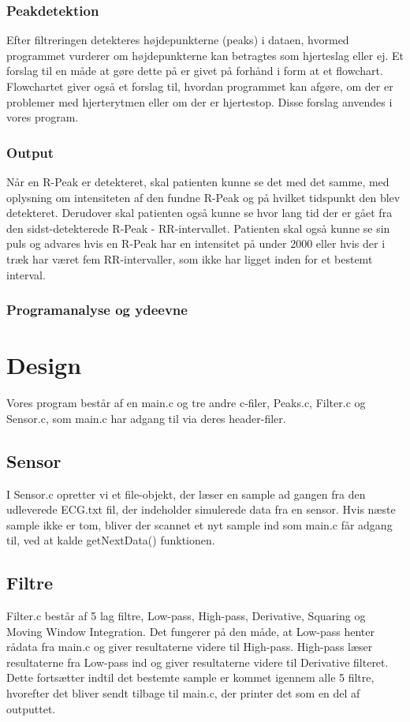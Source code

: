 \documentclass{article}
\begin{document}
\subsubsection{Peakdetektion}
Efter filtreringen detekteres højdepunkterne (peaks) i dataen, hvormed programmet vurderer om højdepunkterne kan betragtes som hjerteslag eller ej. Et forslag til en måde at gøre dette på er givet på forhånd i form at et flowchart. Flowchartet giver også et forslag til, hvordan programmet kan afgøre, om der er problemer med hjerterytmen eller om der er hjertestop. Disse forslag anvendes i vores program.

\subsubsection{Output}
Når en R-Peak er detekteret, skal patienten kunne se det med det samme, med oplysning om intensiteten af den fundne R-Peak og på hvilket tidspunkt den blev detekteret. Derudover skal patienten også kunne se hvor lang tid der er gået fra den sidst-detekterede R-Peak - RR-intervallet. Patienten skal også kunne se sin puls og advares hvis en R-Peak har en intensitet på under 2000 eller hvis der i træk har været fem RR-intervaller, som ikke har ligget inden for et bestemt interval.

\subsubsection{Programanalyse og ydeevne}

\section{Design}
Vores program består af en main.c og tre andre c-filer, Peaks.c, Filter.c og Sensor.c, som main.c har adgang til via deres header-filer. 

\subsection{Sensor}
I Sensor.c opretter vi et file-objekt, der læser en sample ad gangen fra den udleverede ECG.txt fil, der indeholder simulerede data fra en sensor. Hvis næste sample ikke er tom, bliver der scannet et nyt sample ind som main.c får adgang til, ved at kalde getNextData() funktionen.

\subsection{Filtre}
Filter.c består af 5 lag filtre, Low-pass, High-pass, Derivative, Squaring og Moving Window Integration. Det fungerer på den måde, at Low-pass henter rådata fra main.c og giver resultaterne videre til High-pass. High-pass læser resultaterne fra Low-pass ind og giver resultaterne videre til Derivative filteret. Dette fortsætter indtil det bestemte sample er kommet igennem alle 5 filtre, hvorefter det bliver sendt tilbage til main.c, der printer det som en del af outputtet.
\end{document}
